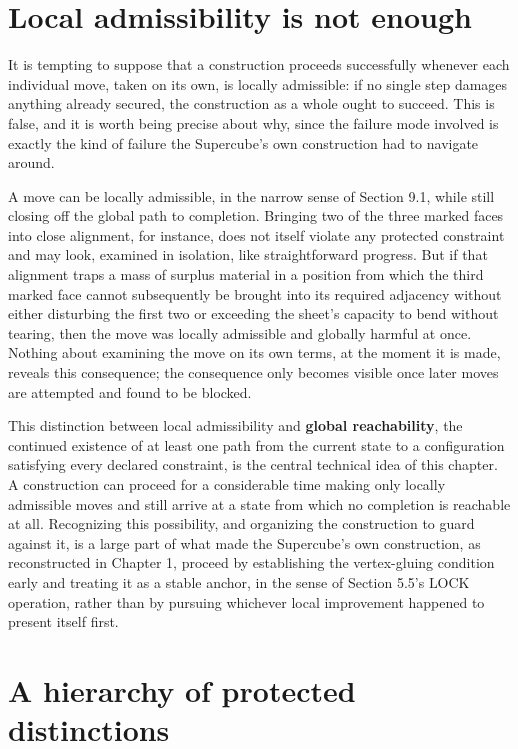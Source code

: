 \documentclass[11pt,oneside]{book}
\begin{document}
\hypertarget{local-admissibility-is-not-enough}{%
\section{Local admissibility is not
enough}\label{local-admissibility-is-not-enough}}

It is tempting to suppose that a construction proceeds successfully
whenever each individual move, taken on its own, is locally admissible:
if no single step damages anything already secured, the construction as
a whole ought to succeed. This is false, and it is worth being precise
about why, since the failure mode involved is exactly the kind of
failure the Supercube's own construction had to navigate around.

A move can be locally admissible, in the narrow sense of Section 9.1,
while still closing off the global path to completion. Bringing two of
the three marked faces into close alignment, for instance, does not
itself violate any protected constraint and may look, examined in
isolation, like straightforward progress. But if that alignment traps a
mass of surplus material in a position from which the third marked face
cannot subsequently be brought into its required adjacency without
either disturbing the first two or exceeding the sheet's capacity to
bend without tearing, then the move was locally admissible and globally
harmful at once. Nothing about examining the move on its own terms, at
the moment it is made, reveals this consequence; the consequence only
becomes visible once later moves are attempted and found to be blocked.

This distinction between local admissibility and \textbf{global
reachability}, the continued existence of at least one path from the
current state to a configuration satisfying every declared constraint,
is the central technical idea of this chapter. A construction can
proceed for a considerable time making only locally admissible moves and
still arrive at a state from which no completion is reachable at all.
Recognizing this possibility, and organizing the construction to guard
against it, is a large part of what made the Supercube's own
construction, as reconstructed in Chapter 1, proceed by establishing the
vertex-gluing condition early and treating it as a stable anchor, in the
sense of Section 5.5's \(\text{LOCK}\) operation, rather than by
pursuing whichever local improvement happened to present itself first.

\hypertarget{a-hierarchy-of-protected-distinctions}{%
\section{A hierarchy of protected
distinctions}\label{a-hierarchy-of-protected-distinctions}}
\end{document}
